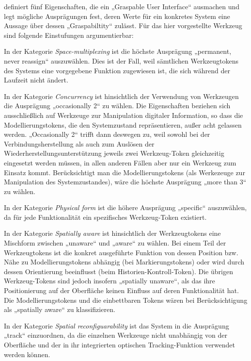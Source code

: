 \citet{Fitzmaurice96} definiert fünf Eigenschaften, die ein „Graspable User Interface“ ausmachen und legt mögliche Ausprägungen fest, deren Werte für ein konkretes System eine Aussage über dessen „Graspabiltity“ zulässt. Für das hier vorgestellte Werkzeug sind folgende Einstufungen argumentierbar:

In der Kategorie \emph{Space-multiplexing} ist die höchste Ausprägung „permanent, never reassign“ auszuwählen. Dies ist der Fall, weil sämtlichen Werkzeugtokens des Systems eine vorgegebene Funktion zugewiesen ist, die sich während der Laufzeit nicht ändert.

In der Kategorie \emph{Concurrency} ist hinsichtlich der Verwendung von Werkzeugen die Ausprägung „occasionally 2“ zu wählen. Die Eigenschaften beziehen sich ausschließlich auf Werkzeuge zur Manipulation digitaler Information, so dass die Modellierungstokens, die den Systemzustand repräsentieren, außer acht gelassen werden. „Occasionally 2“ trifft dann deswegen zu, weil sowohl bei der Verbindungsherstellung als auch zum Auslösen der Wiederherstellungsunterstützung jeweils zwei Werkzeug-Token gleichzeitig eingesetzt werden müssen, in allen anderen Fällen aber nur ein Werkzeug zum Einsatz kommt. Berücksichtigt man die Modellierungstokens (als Werkezeuge zur Manipulation des Systemzustandes), wäre die höchste Ausprägung „more than 3“ zu wählen.

In der Kategorie \emph{Physical form} ist die höhere Ausprägung „specific“ auszuwählen, da für jede Funktionalität ein spezifisches Werkzeug-Token existiert.

In der Kategorie \emph{Spatially aware} ist hinsichtlich der Werkzeugtokens eine Mischform zwischen „unaware“ und „aware“ zu wählen. Bei einem Teil der Werkzeugtokens ist die konkret ausgeführte Funktion von dessen Position bzw. Nähe zu Modellierungstokens abhängig (bei Markierungstokens) oder wird durch dessen Orientierung beeinflusst (beim Historien-Kontroll-Token). Die übrigen Werkzeug-Tokens sind jedoch insofern „spatially unaware“, als das ihre Positionierung auf der Oberfläche keinen Einfluss auf deren Funktionalität hat. Die Modellierungstokens und die einbettbaren Tokens wären bei Berücksichtigung als „spatially aware“ zu klassifizieren.

In der Kategorie \emph{Spatial reconfiguarability} ist das System in die Ausprägung „track“ einzuordnen, da die einzelnen Werkzeuge nicht unabhängig von der Oberfläche und der in ihr integrierten optischen Tracking-Funktion verwendet werden können.


